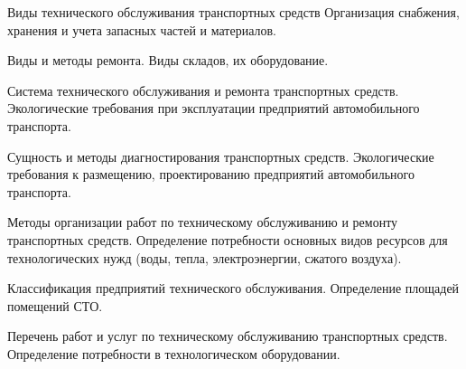 \documentclass[
	14pt,
	a4paper,
	]
	{scrartcl}
\begin{document}
\shapk
{}
\setcounter{zad}{0}

\vfill
\z Виды технического обслуживания транспортных средств
 \vfill
\z Организация снабжения, хранения и учета запасных частей и материалов. \vfill

\vfill

\newpage


\shapk
{}
\setcounter{zad}{0}

\vfill
\z Виды и методы ремонта.
 \vfill
\z Виды складов, их оборудование.
 \vfill

\vfill

\newpage


\shapk
{}
\setcounter{zad}{0}

\vfill
\z Система технического обслуживания и ремонта транспортных средств.
 \vfill
\z Экологические требования при эксплуатации предприятий автомобильного транспорта. 
 \vfill

\vfill

\newpage


\shapk
{}
\setcounter{zad}{0}

\vfill
\z Сущность и методы диагностирования транспортных средств.
 \vfill
\z Экологические требования к размещению, проектированию предприятий автомобильного транспорта. 
 \vfill

\vfill

\newpage


\shapk
{}
\setcounter{zad}{0}

\vfill
\z Методы организации работ по техническому обслуживанию и ремонту транспортных средств.
 \vfill
\z Определение потребности основных видов ресурсов для технологических нужд (воды, тепла, электроэнергии, сжатого воздуха). 
 \vfill

\vfill

\newpage


\shapk
{}
\setcounter{zad}{0}

\vfill
\z Классификация предприятий технического обслуживания.
 \vfill
\z Определение площадей помещений СТО. 
 \vfill

\vfill

\newpage


\shapk
{}
\setcounter{zad}{0}

\vfill
\z Перечень работ и услуг по техническому обслуживанию транспортных средств.
 \vfill
\z  Определение потребности в технологическом оборудовании. 
 \vfill
\end{document}
